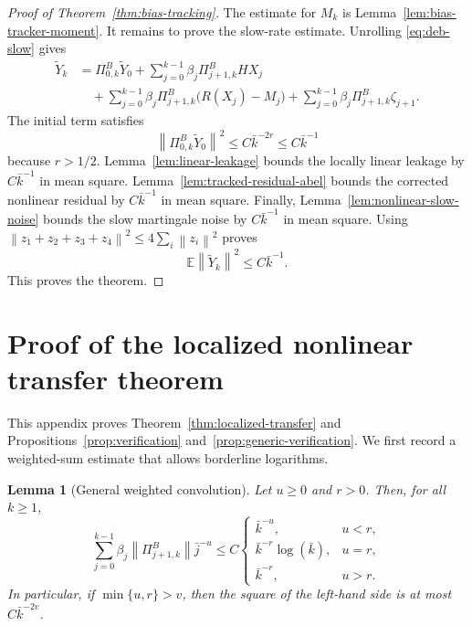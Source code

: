 \documentclass{article}
\newtheorem{lemma}[theorem]{Lemma}
\newcommand{\E}{\mathbb{E}}
\newcommand{\norm}[1]{\left\lVert #1\right\rVert}
\begin{document}
\begin{proof}[Proof of Theorem~\ref{thm:bias-tracking}]
The estimate for $M_k$ is Lemma~\ref{lem:bias-tracker-moment}. It remains to prove the slow-rate estimate. Unrolling \eqref{eq:deb-slow} gives
\begin{align*}
  \widetilde Y_k
  &=\Pi^B_{0,k}\widetilde Y_0
    +\sum_{j=0}^{k-1}\beta_j\Pi^B_{j+1,k}HX_j \\
  &\quad
    +\sum_{j=0}^{k-1}\beta_j\Pi^B_{j+1,k}\big(R(X_j)-M_j\big)
    +\sum_{j=0}^{k-1}\beta_j\Pi^B_{j+1,k}\zeta_{j+1}.
\end{align*}
The initial term satisfies
\[
  \norm{\Pi^B_{0,k}\widetilde Y_0}^2\le C\bar k^{-2r}\le C\bar k^{-1}
\]
because $r>1/2$. Lemma~\ref{lem:linear-leakage} bounds the locally linear leakage by $C\bar k^{-1}$ in mean square. Lemma~\ref{lem:tracked-residual-abel} bounds the corrected nonlinear residual by $C\bar k^{-1}$ in mean square. Finally, Lemma~\ref{lem:nonlinear-slow-noise} bounds the slow martingale noise by $C\bar k^{-1}$ in mean square. Using $\norm{z_1+z_2+z_3+z_4}^2\le4\sum_i\norm{z_i}^2$ proves
\[
  \E\norm{\widetilde Y_k}^2\le C\bar k^{-1}.
\]
This proves the theorem.
\end{proof}

\section{Proof of the localized nonlinear transfer theorem}
\label{app:localized-transfer}

This appendix proves Theorem~\ref{thm:localized-transfer} and Propositions~\ref{prop:verification} and~\ref{prop:generic-verification}. We first record a weighted-sum estimate that allows borderline logarithms.

\begin{lemma}[General weighted convolution]\label{lem:general-weighted}
Let $u\ge0$ and $r>0$. Then, for all $k\ge1$,
\begin{equation}
  \sum_{j=0}^{k-1}\beta_j\norm{\Pi^B_{j+1,k}}\bar j^{-u}
  \le
  C\begin{cases}
    \bar k^{-u}, & u<r,\\
    \bar k^{-r}\log(\bar k), & u=r,\\
    \bar k^{-r}, & u>r.
  \end{cases} \label{eq:general-weighted}
\end{equation}
In particular, if $\min\{u,r\}>v$, then the square of the left-hand side is at most $C\bar k^{-2v}$.
\end{lemma}
\end{document}

